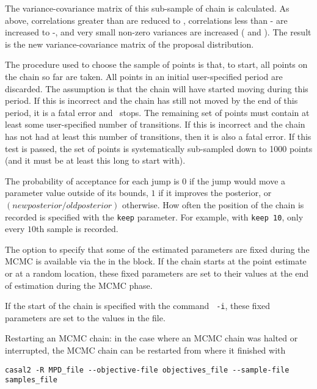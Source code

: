 The variance-covariance matrix of this sub-sample of chain is calculated. As above, correlations greater than  are reduced to , correlations less than - are increased to  -, and very small non-zero variances are increased ( and ). The result is the new variance-covariance matrix of the proposal distribution. 

The procedure used to choose the sample of points is that, to start, all points on the chain so far are taken.  All points in an initial user-specified period are discarded. The assumption is that the chain will have started moving during this period. If this is incorrect and the chain has still not moved by the end of this period, it is a fatal error and \CNAME\ stops. The remaining set of points must contain at least some user-specified number of transitions. If this is incorrect and the chain has not had at least this number of transitions, then it is also a fatal error. If this test is passed, the set of points is systematically sub-sampled down to 1000 points (and it must be at least this long to start with).

The probability of acceptance for each jump is $0$ if the jump would move a parameter value outside of its bounds, $1$ if it improves the posterior, or $(new posterior/old posterior)$ otherwise. How often the position of the chain is recorded is specified with the \texttt{keep} parameter. For example, with \texttt{keep 10}, only every $10$th sample is recorded.

The option to specify that some of the estimated parameters are fixed during the MCMC is available via the  in the  block. If the chain starts at the point estimate or at a random location, these fixed parameters are set to their values at the end of estimation during the MCMC phase.

If  the start of the chain is specified with the command \texttt{\cname\ -i}, these fixed parameters are set to the values in the file.

Restarting an MCMC chain: in the case where an MCMC chain was halted or interrupted, the MCMC chain can be restarted from where it finished with

{\small{\begin{verbatim}
casal2 -R MPD_file --objective-file objectives_file --sample-file samples_file
\end{verbatim}}}

